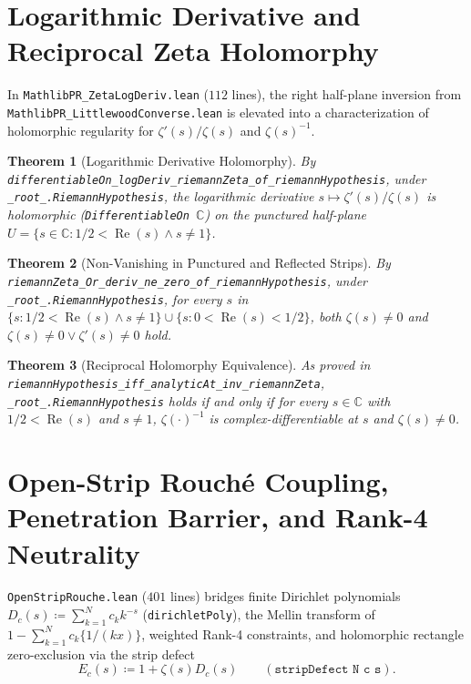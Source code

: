 \documentclass[11pt,a4paper]{article}
\newtheorem{theorem}{Theorem}[section]
\theoremstyle{definition}
\newcommand{\Cfield}{\mathbb{C}}
\begin{document}
\section{Logarithmic Derivative and Reciprocal Zeta Holomorphy}\label{sec:zetalogderiv}

In \texttt{MathlibPR\_\allowbreak ZetaLogDeriv.lean} ($112$ lines), the right half-plane inversion from \texttt{MathlibPR\_\allowbreak LittlewoodConverse.lean} is elevated into a characterization of holomorphic regularity for $\zeta'(s)/\zeta(s)$ and $\zeta(s)^{-1}$.

\begin{theorem}[Logarithmic Derivative Holomorphy]
By \texttt{differentiableOn\_\allowbreak logDeriv\_\allowbreak riemannZeta\_\allowbreak of\_\allowbreak riemannHypothesis}, under \texttt{\_root\_.\allowbreak RiemannHypothesis}, the logarithmic derivative $s \mapsto \zeta'(s)/\zeta(s)$ is holomorphic (\texttt{DifferentiableOn $\Cfield$}) on the punctured half-plane $U = \{s \in \Cfield : 1/2 < \operatorname{Re}(s) \land s \neq 1\}$.
\end{theorem}

\begin{theorem}[Non-Vanishing in Punctured and Reflected Strips]
By \texttt{riemannZeta\_\allowbreak Or\_\allowbreak deriv\_\allowbreak ne\_\allowbreak zero\_\allowbreak of\_\allowbreak riemannHypothesis}, under \texttt{\_root\_.\allowbreak RiemannHypothesis}, for every $s$ in $\{s : 1/2 < \operatorname{Re}(s) \land s \neq 1\} \cup \{s : 0 < \operatorname{Re}(s) < 1/2\}$, both $\zeta(s) \neq 0$ and $\zeta(s) \neq 0 \lor \zeta'(s) \neq 0$ hold.
\end{theorem}

\begin{theorem}[Reciprocal Holomorphy Equivalence]
As proved in \texttt{riemannHypothesis\_\allowbreak iff\_\allowbreak analyticAt\_\allowbreak inv\_\allowbreak riemannZeta}, \texttt{\_root\_.\allowbreak RiemannHypothesis} holds if and only if for every $s \in \Cfield$ with $1/2 < \operatorname{Re}(s)$ and $s \neq 1$, $\zeta(\cdot)^{-1}$ is complex-differentiable at $s$ and $\zeta(s) \neq 0$.
\end{theorem}

\section{Open-Strip Rouch\'e Coupling, Penetration Barrier, and Rank-4 Neutrality}\label{sec:open_strip_rouche}

\texttt{OpenStripRouche.lean} ($401$ lines) bridges finite Dirichlet polynomials $D_c(s) \coloneqq \sum_{k=1}^N c_k k^{-s}$ (\texttt{dirichletPoly}), the Mellin transform of $1 - \sum_{k=1}^N c_k \{1/(kx)\}$, weighted Rank-4 constraints, and holomorphic rectangle zero-exclusion via the strip defect
\begin{equation}
E_c(s) \coloneqq 1 + \zeta(s) D_c(s) \qquad (\texttt{stripDefect N c s}).
\end{equation}
\end{document}
